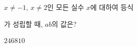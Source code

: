 $x\ne -1$, $x\ne 2$인 모든 실수 $x$에 대하여 등식\par\smallskip{}\par\smallskip\noindent 가 성립할 때, $ab$의 값은? 
\begin{choices32}{$2$}{$4$}{$6$}{$8$}{$10$}\end{choices32}
